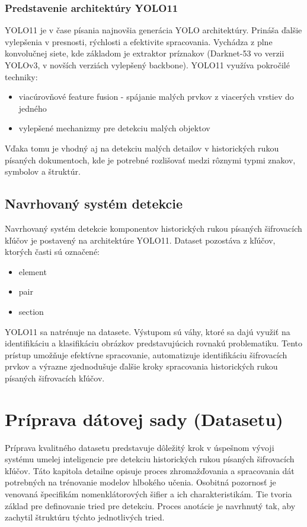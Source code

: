         \subsubsection{Predstavenie architektúry YOLO11}
        YOLO11 je v čase písania najnovšia generácia YOLO architektúry. Prináša ďalšie vylepšenia v presnosti, rýchlosti a efektivite spracovania. Vychádza z plne konvolučnej siete, kde základom je extraktor príznakov (Darknet-53 vo verzii YOLOv3, v novších verziách vylepšený backbone)\cite{redmon2018yolov3}. YOLO11 využíva pokročilé techniky:
        \begin{itemize}
            \item viacúrovňové feature fusion - spájanie malých prvkov z viacerých vrstiev do jedného
            \item vylepšené mechanizmy pre detekciu malých objektov
        \end{itemize}
        Vďaka tomu je vhodný aj na detekciu malých detailov v historických rukou písaných dokumentoch, kde je potrebné rozlišovať medzi rôznymi typmi znakov, symbolov a štruktúr.
    \subsection{Navrhovaný systém detekcie}
    Navrhovaný systém detekcie komponentov historických rukou písaných šifrovacích kľúčov je postavený na architektúre YOLO11. Dataset pozostáva z kľúčov, ktorých časti sú označené:
    \begin{itemize}
        \item element
        \item pair
        \item section
    \end{itemize}
    YOLO11 sa natrénuje na datasete. Výstupom sú váhy, ktoré sa dajú využiť na identifikáciu a klasifikáciu obrázkov predstavujúcich rovnakú problematiku. Tento prístup umožňuje efektívne spracovanie, automatizuje identifikáciu šifrovacích prvkov a výrazne zjednodušuje ďalšie kroky spracovania historických rukou písaných šifrovacích kľúčov.

\section{Príprava dátovej sady (Datasetu)}
Príprava kvalitného datasetu predstavuje dôležitý krok v úspešnom vývoji systému umelej inteligencie pre detekciu historických rukou písaných šifrovacích kľúčov. Táto kapitola detailne opisuje proces zhromažďovania a spracovania dát potrebných na trénovanie modelov hlbokého učenia. Osobitná pozornosť je venovaná špecifikám nomenklátorových šifier a ich charakteristikám. Tie tvoria základ pre definovanie tried pre detekciu. Proces anotácie je navrhnutý tak, aby zachytil štruktúru týchto jednotlivých tried. 
